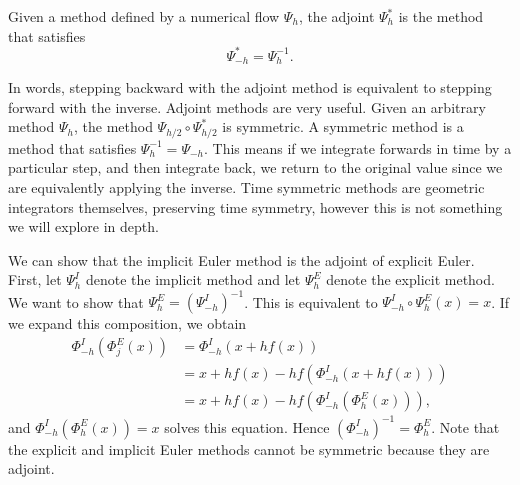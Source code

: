 \begin{definition}
	Given a method defined by a numerical flow $\Psi_h$,
	the adjoint $\Psi^*_h$ is the method that satisfies
	\begin{equation*}
		\Psi^*_{-h} = \Psi^{-1}_h.
	\end{equation*}
\end{definition}

In words, stepping backward with the adjoint method is equivalent to stepping forward with the inverse.
Adjoint methods are very useful. Given an arbitrary method $\Psi_h$,
the method $\Psi_{h/2} \circ \Psi_{h/2}^*$ is symmetric.
A symmetric method is a method that satisfies $\Psi_h^{-1} = \Psi_{-h}$.
This means if we integrate forwards in time by a particular step, and then integrate back,
we return to the original value since we are equivalently applying the inverse.
Time symmetric methods are geometric integrators themselves, preserving time symmetry,
however this is not something we will explore in depth.

We can show that the implicit Euler method is the adjoint of explicit Euler.
First, let $\Psi_h^I$ denote the implicit method and let $\Psi_h^E$ denote the explicit method.
We want to show that $\Psi_h^E = (\Psi_{-h}^I)^{-1}$.
This is equivalent to $\Psi_{-h}^I \circ \Psi_h^E (x) = x$.
If we expand this composition, we obtain
\begin{align*}
	\Phi_{-h}^I \left( \Phi_j^E  (x) \right) &= \Phi_{-h}^I \left( x + h f(x) \right) \\
	&= x + h f(x) - h f\left( \Phi_{-h}^I \left( x + h f(x) \right) \right) \\
	&= x + h f(x) - h f\left( \Phi_{-h}^I \left( \Phi_h^E (x) \right) \right),
\end{align*}
and $\Phi_{-h}^I (\Phi_h^E (x)) = x$ solves this equation. Hence $(\Phi_{-h}^I)^{-1} = \Phi_h^E$.
Note that the explicit and implicit Euler methods cannot be symmetric because they are adjoint.

